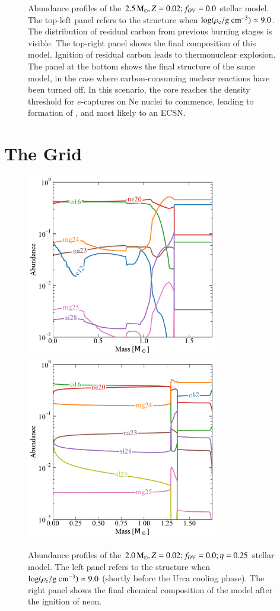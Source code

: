 \documentclass[main.tex]{subfiles}
\begin{document}
\begin{figure}[hbt!]
    \caption{Abundance profiles of the \seriesone $ 2.5\mathrm{\,M_\odot},  Z=0.02;f_{OV}=0.0$ stellar model. The top-left panel refers to the structure when $\rm \log(\rho_c / g \ cm^{-3}) \simeq 9.0$. The distribution of residual carbon from previous burning stages is visible. The top-right panel shows the final composition of this model. Ignition of residual carbon leads to thermonuclear explosion.
    The panel at the bottom shows the final structure of the same model, in the case where carbon-consuming nuclear reactions have been turned off.
    In this scenario, the core reaches the density threshold for $e$-captures on Ne nuclei to commence, leading to formation of , and most likely to an ECSN.}
    \label{apx:fig:eta1p0}
\end{figure}


\clearpage
\section{The \seriestwo Grid}

\begin{figure}[hbt!]
    \centering 
    \includegraphics[height=8cm]{figures/chapter2/abundances/2p0_eta0p25_Rho9.pdf}\quad
    \includegraphics[height=8cm]{figures/chapter2/abundances/2p0_eta0p25_final_abun.pdf}
    \caption{Abundance profiles of the \seriestwo $ 2.0\mathrm{\,M_\odot},  Z=0.02;f_{OV}=0.0; \eta=0.25$ stellar model. The left panel refers to the structure when $\rm \log(\rho_c / g \ cm^{-3}) \simeq 9.0$ (shortly before the Urca cooling phase). The right panel shows the final chemical composition of the model after the ignition of neon.}
    \label{apx:fig:eta0p25}
\end{figure}
\end{document}
